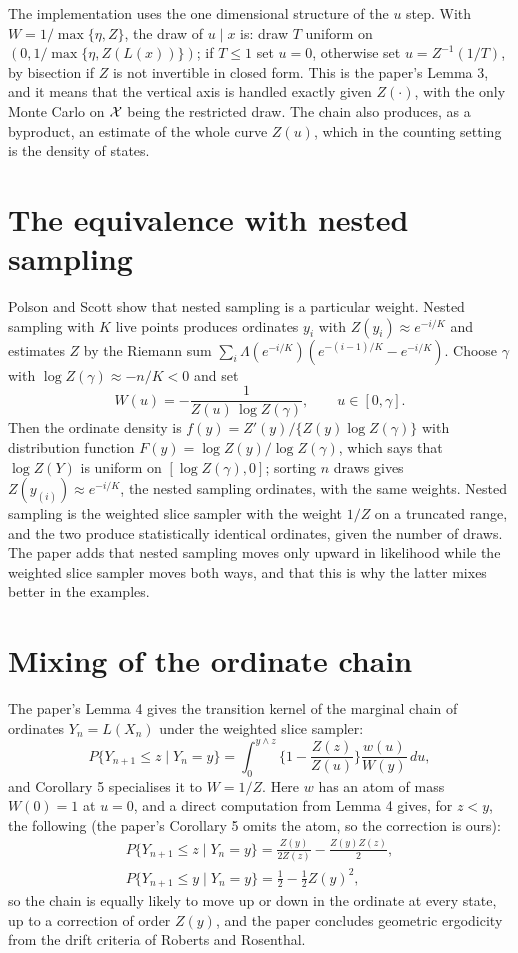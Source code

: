 The implementation uses the one dimensional structure of the $u$ step. With $W = 1 / \max\{\eta, Z\}$, the draw of $u \mid x$ is: draw $T$ uniform on $(0, 1 / \max\{ \eta, Z(L(x)) \})$; if $T \le 1$ set $u = 0$, otherwise set $u = Z^{-1}(1/T)$, by bisection if $Z$ is not invertible in closed form. This is the paper's Lemma 3, and it means that the vertical axis is handled exactly given $Z(\cdot)$, with the only Monte Carlo on $\mathcal{X}$ being the restricted draw. The chain also produces, as a byproduct, an estimate of the whole curve $Z(u)$, which in the counting setting is the density of states.

\section{The equivalence with nested sampling}

Polson and Scott show that nested sampling is a particular weight. Nested sampling with $K$ live points produces ordinates $y_i$ with $Z(y_i) \approx e^{-i/K}$ and estimates $Z$ by the Riemann sum $\sum_i \Lambda(e^{-i/K}) ( e^{-(i-1)/K} - e^{-i/K} )$. Choose $\gamma$ with $\log Z(\gamma) \approx -n/K < 0$ and set
\[
W(u) = -\frac{1}{ Z(u) \, \log Z(\gamma) } , \qquad u \in [0, \gamma] .
\]
Then the ordinate density is $f(y) = Z'(y) / \{ Z(y) \log Z(\gamma) \}$ with distribution function $F(y) = \log Z(y) / \log Z(\gamma)$, which says that $\log Z(Y)$ is uniform on $[\log Z(\gamma), 0]$; sorting $n$ draws gives $Z(y_{(i)}) \approx e^{-i/K}$, the nested sampling ordinates, with the same weights. Nested sampling is the weighted slice sampler with the weight $1/Z$ on a truncated range, and the two produce statistically identical ordinates, given the number of draws. The paper adds that nested sampling moves only upward in likelihood while the weighted slice sampler moves both ways, and that this is why the latter mixes better in the examples.

\section{Mixing of the ordinate chain}

The paper's Lemma 4 gives the transition kernel of the marginal chain of ordinates $Y_n = L(X_n)$ under the weighted slice sampler:
\[
P\{ Y_{n+1} \le z \mid Y_n = y \} = \int_0^{y \wedge z} \Big\{ 1 - \frac{ Z(z) }{ Z(u) } \Big\} \frac{ w(u) }{ W(y) } \, du ,
\]
and Corollary 5 specialises it to $W = 1/Z$. Here $w$ has an atom of mass $W(0) = 1$ at $u = 0$, and a direct computation from Lemma 4 gives, for $z < y$, the following (the paper's Corollary 5 omits the atom, so the correction is ours):
\begin{gather*}
P\{ Y_{n+1} \le z \mid Y_n = y \} = \frac{ Z(y) }{ 2 Z(z) } - \frac{ Z(y) Z(z) }{ 2 } , \\
P\{ Y_{n+1} \le y \mid Y_n = y \} = \tfrac12 - \tfrac12 Z(y)^2 ,
\end{gather*}
so the chain is equally likely to move up or down in the ordinate at every state, up to a correction of order $Z(y)$, and the paper concludes geometric ergodicity from the drift criteria of Roberts and Rosenthal.

